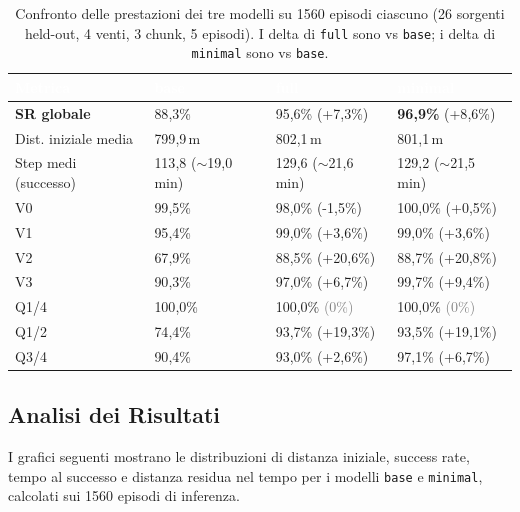 \documentclass[12pt, a4paper]{article}
\begin{document}
\begin{table}[htbp]
\centering
\renewcommand{\arraystretch}{1.3}
\small
\newcommand{\dpos}[1]{{\scriptsize\textcolor{green!50!black}{(+#1\%)}}}
\newcommand{\dneg}[1]{{\scriptsize\textcolor{red!70!black}{(-#1\%)}}}
\newcommand{\dzero}{{\scriptsize\textcolor{gray}{(0\%)}}}
\begin{tabular}{L{3.5cm} C{2.4cm} C{3.2cm} C{3.2cm}}
\toprule
{}
\textcolor{white}{\textbf{Metrica}} &
\textcolor{white}{\textbf{base}} &
\textcolor{white}{\textbf{full}} &
\textcolor{white}{\textbf{minimal}} \\
\midrule
{}
\textbf{SR globale} & 88{,}3\% & 95{,}6\% \dpos{7{,}3} & \textbf{96{,}9\%} \dpos{8{,}6} \\
Dist. iniziale media & 799{,}9\,m & 802{,}1\,m & 801{,}1\,m \\
Step medi (successo) & 113{,}8 ($\sim$19{,}0\,min) & 129{,}6 ($\sim$21{,}6\,min) & 129{,}2 ($\sim$21{,}5\,min) \\
\midrule
V0 & 99{,}5\% & 98{,}0\% \dneg{1{,}5} & 100{,}0\% \dpos{0{,}5} \\
V1 & 95{,}4\% & 99{,}0\% \dpos{3{,}6} & 99{,}0\% \dpos{3{,}6} \\
V2 & 67{,}9\% & 88{,}5\% \dpos{20{,}6} & 88{,}7\% \dpos{20{,}8} \\
V3 & 90{,}3\% & 97{,}0\% \dpos{6{,}7} & 99{,}7\% \dpos{9{,}4} \\
\midrule
Q1/4 & 100{,}0\% & 100{,}0\% \dzero & 100{,}0\% \dzero \\
Q1/2 & 74{,}4\% & 93{,}7\% \dpos{19{,}3} & 93{,}5\% \dpos{19{,}1} \\
Q3/4 & 90{,}4\% & 93{,}0\% \dpos{2{,}6} & 97{,}1\% \dpos{6{,}7} \\
\bottomrule
\end{tabular}
\caption{Confronto delle prestazioni dei tre modelli su 1560 episodi ciascuno
         (26 sorgenti held-out, 4 venti, 3 chunk, 5 episodi).
         I delta di \texttt{full} sono vs \texttt{base}; i delta di \texttt{minimal} sono vs \texttt{base}.}
\end{table}

\subsection{Analisi dei Risultati}

I grafici seguenti mostrano le distribuzioni di distanza iniziale, success rate, tempo al successo e distanza residua nel tempo per i modelli \texttt{base} e \texttt{minimal}, calcolati sui 1560 episodi di inferenza.
\end{document}
